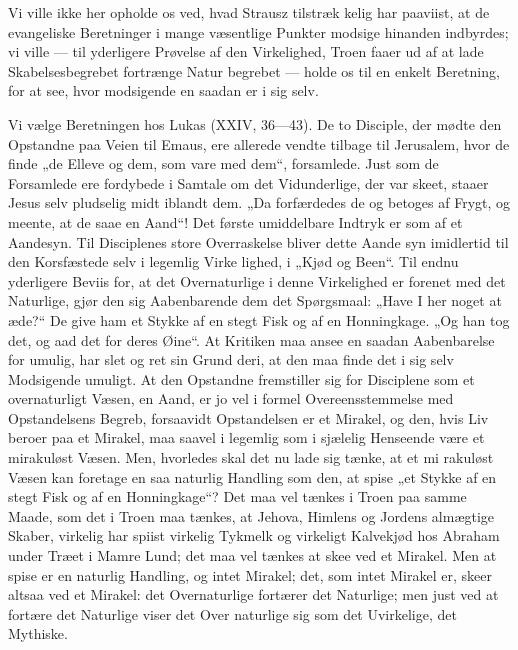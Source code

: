\documentclass[12pt]{book}
\newcommand{\opage}[1]{\marginnote{\footnotesize\textit{[#1]}}}
\begin{document}
Vi ville ikke her opholde os ved, hvad Strausz tilstræk\-%
kelig har paaviist, at de evangeliske Beretninger i mange
væsentlige Punkter modsige hinanden indbyrdes; vi ville
--- til yderligere Prøvelse af den Virkelighed, Troen
faaer ud af at lade Skabelsesbegrebet fortrænge Natur\-%
begrebet --- holde os til en enkelt Beretning, for at see,
hvor modsigende en saadan er i sig selv.

Vi vælge Beretningen hos Lukas (XXIV, 36---43).
De to Disciple, der mødte den Opstandne paa Veien
til Emaus, ere allerede vendte tilbage til Jerusalem,
hvor de finde „de Elleve og dem, som vare med dem“,
forsamlede. Just som de Forsamlede ere fordybede i
Samtale om det Vidunderlige, der var skeet, staaer
Jesus selv pludselig midt iblandt dem. „Da forfærdedes de
og betoges af Frygt, og meente, at de saae en Aand“!
Det første umiddelbare Indtryk er som af et Aandesyn.
Til Disciplenes store Overraskelse bliver dette Aande\-%
syn imidlertid til den Korsfæstede selv i legemlig Virke\-%
lighed, i „Kjød og Been“. Til endnu yderligere Beviis
for, at det Overnaturlige i denne Virkelighed er forenet
med det Naturlige, gjør den sig Aabenbarende dem det
Spørgsmaal: „Have I her noget at æde?“ De give ham
et Stykke af en stegt Fisk og af en Honningkage. „Og
han tog det, og aad det for deres Øine“. At Kritiken
maa ansee en saadan Aabenbarelse for umulig, har slet
\opage{165}\setcounter{footnote}{0}%
og ret sin Grund deri, at den maa finde det i sig selv
Modsigende umuligt. At den Opstandne fremstiller sig
for Disciplene som et overnaturligt Væsen, en Aand, er
jo vel i formel Overeensstemmelse med Opstandelsens
Begreb, forsaavidt Opstandelsen er et Mirakel, og den,
hvis Liv beroer paa et Mirakel, maa saavel i legemlig
som i sjælelig Henseende være et mirakuløst Væsen.
Men, hvorledes skal det nu lade sig tænke, at et mi\-%
rakuløst Væsen kan foretage en saa naturlig Handling
som den, at spise „et Stykke af en stegt Fisk og af en
Honningkage“? Det maa vel tænkes i Troen paa samme
Maade, som det i Troen maa tænkes, at Jehova, Himlens
og Jordens almægtige Skaber, virkelig har spiist virkelig
Tykmelk og virkeligt Kalvekjød hos Abraham under
Træet i Mamre Lund; det maa vel tænkes at skee ved
et Mirakel. Men at spise er en naturlig Handling, og
intet Mirakel; det, som intet Mirakel er, skeer altsaa ved
et Mirakel: det Overnaturlige fortærer det Naturlige;
men just ved at fortære det Naturlige viser det Over\-%
naturlige sig som det Uvirkelige, det Mythiske.
\end{document}
